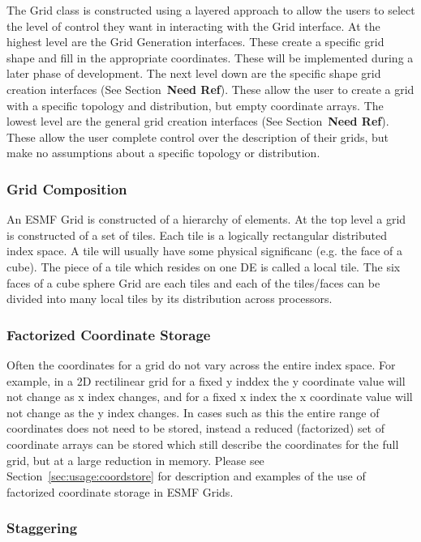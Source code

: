  The Grid class is constructed using a layered approach to allow the 
users to select the level of control they want in interacting with
the Grid interface. At the highest level are the Grid Generation interfaces. 
These create a specific grid shape and fill in the appropriate coordinates. 
These will be implemented during a later phase of development. The
next level down are the specific shape grid creation interfaces (See Section~\textbf{Need Ref}). 
These allow the user to create a grid with a specific topology and 
distribution, but empty coordinate arrays. The lowest level are
the general grid creation interfaces (See Section~\textbf{Need Ref}). These allow the user
complete control over the description of their grids, but
make no assumptions about a specific topology or distribution. 

\subsubsection{Grid Composition}\label{sec:gridcomp}
  An ESMF Grid is constructed of a hierarchy of elements. At the top
level a grid is constructed of a set of tiles. Each tile is a logically
rectangular distributed index space. A tile will usually have some
physical significanc (e.g. the face of a cube). The piece of a tile
which resides on one DE is called a local tile. The six faces of a
cube sphere Grid are each tiles and each of 
the tiles/faces can be divided into many local tiles by its distribution 
across processors. 

\subsubsection{Factorized Coordinate Storage}

 Often the coordinates for a grid do not vary across the entire
index space. For example, in a 2D rectilinear grid for a fixed y
inddex the y coordinate value will not change as x index changes,
and for a fixed x index the x coordinate value will not change as the
y index changes. In cases such as this the entire range of 
coordinates does not need to be stored, instead a reduced
(factorized) set of coordinate arrays can be stored which 
still describe the coordinates for the full grid, but at a large reduction in 
memory. Please see Section~\ref{sec:usage:coordstore} for
description and examples of the use of factorized coordinate
storage in ESMF Grids. 


\subsubsection{Staggering}

